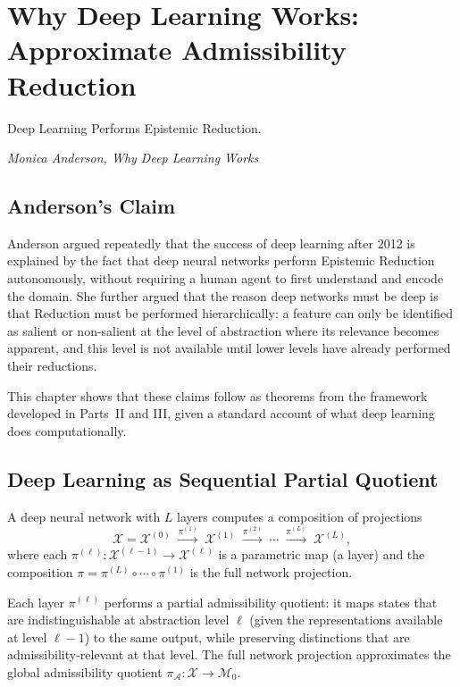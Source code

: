 \documentclass[12pt, a4paper, oneside]{book}
\newcommand{\Adm}{\mathcal{A}}
\newcommand{\X}{\mathcal{X}}
\newcommand{\M}{\mathcal{M}}
\newcommand{\proj}{\pi}
\newcommand{\projA}{\pi_{\!\Adm}}
\begin{document}
\chapter{Why Deep Learning Works: Approximate Admissibility Reduction}
\label{ch:deeplearning}

\epigraph{%
  Deep Learning Performs Epistemic Reduction.%
}{\textit{Monica Anderson, \emph{Why Deep Learning Works}}}

\section{Anderson's Claim}

Anderson argued repeatedly that the success of deep learning after 2012
is explained by the fact that deep neural networks perform Epistemic
Reduction autonomously, without requiring a human agent to first
understand and encode the domain. She further argued that the reason
deep networks must be deep is that Reduction must be performed
hierarchically: a feature can only be identified as salient or
non-salient at the level of abstraction where its relevance becomes
apparent, and this level is not available until lower levels have
already performed their reductions.

This chapter shows that these claims follow as theorems from the
framework developed in Parts~II and III, given a standard account of
what deep learning does computationally.

\section{Deep Learning as Sequential Partial Quotient}

\begin{definition}
\label{def:layerwise}
A deep neural network with $L$ layers computes a composition of
projections
\[
  \X = \X^{(0)}
  \;\xrightarrow{\proj^{(1)}}\;
  \X^{(1)}
  \;\xrightarrow{\proj^{(2)}}\;
  \cdots
  \;\xrightarrow{\proj^{(L)}}\;
  \X^{(L)},
\]
where each $\proj^{(\ell)} : \X^{(\ell-1)} \to \X^{(\ell)}$ is a
parametric map (a layer) and the composition
$\proj = \proj^{(L)} \circ \cdots \circ \proj^{(1)}$
is the full network projection.
\end{definition}

\begin{proposition}
\label{prop:layered-reduction}
Each layer $\proj^{(\ell)}$ performs a partial admissibility quotient:
it maps states that are indistinguishable at abstraction level $\ell$
(given the representations available at level $\ell-1$) to the same
output, while preserving distinctions that are admissibility-relevant
at that level. The full network projection approximates the global
admissibility quotient $\projA : \X \to \M_0$.
\end{proposition}
\end{document}
